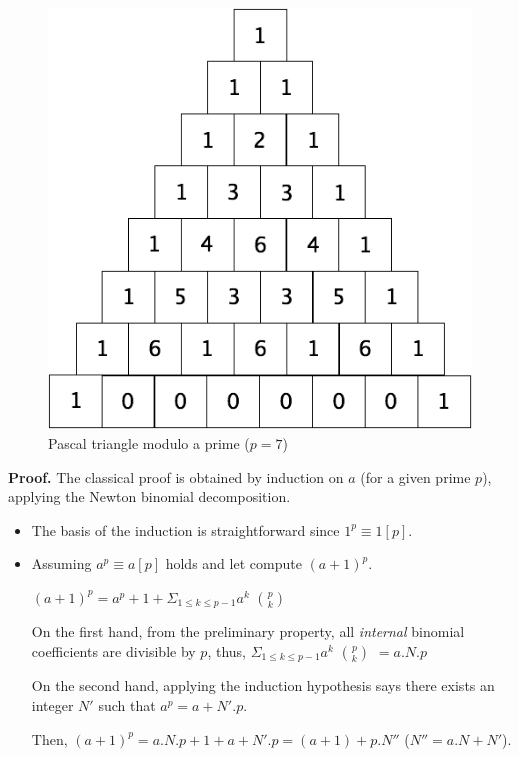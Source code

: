\begin{figure}[h]
\begin{center}
        \includegraphics[scale=0.3]{FiguresArithmetic/TrianglePascalModulo7.png}
        \caption{Pascal triangle modulo a prime ($p=7$)}
        \label{fig:TriangleModulo7}
\end{center}
\end{figure}

\noindent \textbf{Proof.}
The classical proof is obtained by induction on $a$ (for a given prime $p$), applying the Newton binomial decomposition.

\begin{itemize}
\item The basis of the induction is straightforward since $1^{p} \equiv 1 [p]$.

\item Assuming $a^{p} \equiv a [p]$ holds and let compute $(a+1)^{p}$.

 $(a+1)^{p} = a^p + 1 + \Sigma_{1 \leq k \leq p-1} a^k $ ${p}\choose{k}$
\bigskip

On the first hand, from the preliminary property, all \textit{internal} binomial coefficients are divisible by $p$, thus, 
$\Sigma_{1 \leq k \leq p-1} a^k $ ${p}\choose{k} $ $= a.N.p$

On the second hand, applying the induction hypothesis says there exists an integer $N'$ such that  $a^{p} = a + N'.p$.

Then, $(a+1)^{p} = a.N.p +1 + a + N'.p = (a+1) + p.N''$ ($N''=a.N+N'$).
\end{itemize}


